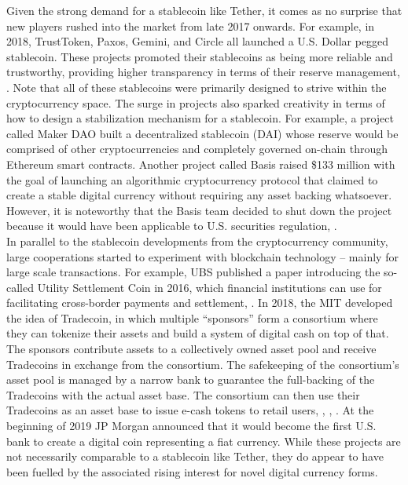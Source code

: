 \documentclass[conference]{IEEEtran}
\begin{document}
Given the strong demand for a stablecoin like Tether, it comes as no surprise that new players rushed into the market from late 2017 onwards. For example, in 2018, TrustToken, Paxos, Gemini, and Circle all launched a U.S. Dollar pegged stablecoin. These projects promoted their stablecoins as being more reliable and trustworthy, providing higher transparency in terms of their reserve management, \cite{Gemini}\cite{Coinbase}\cite{Huobi2}. Note that all of these stablecoins were primarily designed to strive within the cryptocurrency space. The surge in projects also sparked creativity in terms of how to design a stabilization mechanism for a stablecoin. For example, a project called Maker DAO built a decentralized stablecoin (DAI) whose reserve would be comprised of other cryptocurrencies and completely governed on-chain through Ethereum smart contracts. Another project called Basis raised \$133 million with the goal of launching an algorithmic cryptocurrency protocol that claimed to create a stable digital currency without requiring any asset backing whatsoever. However, it is noteworthy that the Basis team decided to shut down the project because it would have been applicable to U.S. securities regulation, \cite{Basis}.\\

In parallel to the stablecoin developments from the cryptocurrency community, large cooperations started to experiment with blockchain technology -- mainly for large scale transactions. For example, UBS published a paper introducing the so-called Utility Settlement Coin in 2016, which financial institutions can use for facilitating cross-border payments and settlement, \cite{UBS}. In 2018, the MIT developed the idea of Tradecoin, in which multiple ``sponsors'' form a consortium where they can tokenize their assets and build a system of digital cash on top of that. The sponsors contribute assets to a collectively owned asset pool and receive Tradecoins in exchange from the consortium. The safekeeping of the consortium's asset pool is managed by a narrow bank to guarantee the full-backing of the Tradecoins with the actual asset base. The consortium can then use their Tradecoins as an asset base to issue e-cash tokens to retail users, \cite{Lipton}, \cite{Lipton3}, \cite{Lipton4}. At the beginning of 2019 JP Morgan announced that it would become the first U.S. bank to create a digital coin representing a fiat currency. While these projects are not necessarily comparable to a stablecoin like Tether, they do appear to have been fuelled by the associated rising interest for novel digital currency forms. 
\end{document}
